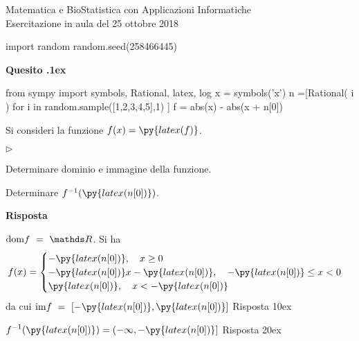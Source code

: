 \documentclass[11pt,twoside,a4paper]{article}
\newcommand{\mylabel}[1]{#1\hfill}
\renewenvironment{itemize}
  {\begin{list}{$\triangleright$}{%
   \setlength{\parskip}{0mm}
   \setlength{\topsep}{.4\baselineskip}
   \setlength{\rightmargin}{0mm}
   \setlength{\listparindent}{0mm}
   \setlength{\itemindent}{0mm}
   \setlength{\labelwidth}{2ex}
   \setlength{\itemsep}{.4\baselineskip}
   \setlength{\parsep}{0mm}
   \setlength{\partopsep}{0mm}
   \setlength{\labelsep}{1ex}
   \setlength{\leftmargin}{\labelwidth+\labelsep}
   \let\makelabel\mylabel}}{%
   \end{list}\vspace*{-1.3mm}}
\newcounter{quesito}
\newenvironment{question}{\addtocounter{quesito}{1}\par\textbf{Quesito \thequesito.\kern1ex}}{\vspace{0.5\parskip}}
\newenvironment{answer}{\par\textbf{Risposta\quad}}{\vspace{\parskip}}
\begin{document}
\colorbox{blue!10}{\begin{minipage}{\textwidth}
Matematica e BioStatistica con Applicazioni Informatiche\\
Esercitazione in aula del 25 ottobre 2018
\end{minipage}}

\bigskip


\begin{pycode}
import random
random.seed(258466445)
\end{pycode}
\begin{question}
\def\RR{{\mathds R}}
\def\dom{{\rm dom}}
\def\range{{\rm im}}
\begin{pycode}
from sympy import symbols, Rational, latex, log
x = symbols('x')
n =[Rational( i ) for i in random.sample([1,2,3,4,5],1) ]
f = abs(x) - abs(x + n[0])
\end{pycode}
Si consideri la funzione $\displaystyle f(x) = \py{latex(f)}$.
\begin{itemize}
\item[1.] Determinare dominio e immagine della funzione.
\item[2.] Determinare $f^{-1}(\py{latex(n[0])})$.
\end{itemize}

\begin{answer}

{\color{blue}
$\displaystyle \dom f \ =\ \RR$.} Si ha $$f(x) = \begin{cases} -\py{latex(n[0])}, \quad x \geq 0 \cr - \py{latex(n[0])} x - \py{latex(n[0])}, \quad - \py{latex(n[0])} \leq x < 0 \cr \py{latex(n[0])}, \quad x < -\py{latex(n[0])} \end{cases}$$ da cui {\color{blue} $\displaystyle \range f \ =\ [-\py{latex(n[0])}, \py{latex(n[0])}]$
\hfill Risposta 1\kern0ex}

{\color{blue}
$\displaystyle f^{-1}(\py{latex(n[0])}) = (-\infty, -\py{latex(n[0])}]$
\hfill Risposta 2\kern0ex}

\end{answer}
\end{question}
\end{document}
